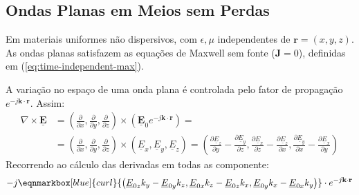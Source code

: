 \clearpage
\subsection{Ondas Planas em Meios sem Perdas} \label{sec:ondas-sem-perdas}

Em materiais uniformes não dispersivos, com $\epsilon, \mu$ independentes de $\mathbf{r} = (x, y, z)$. As ondas planas satisfazem as equações de Maxwell sem fonte ($\mathbf{J} = 0$), definidas em (\ref{eq:time-independent-max}).

A variação no espaço de uma onda plana é controlada pelo fator de propagação $e^{-j \mathbf{k}\cdot\mathbf{r}}$. Assim:
\begin{equation}
    \begin{aligned}
        \nabla \times \mathbf{\underline{E}} &= \left( \frac{\partial}{\partial x}, \frac{\partial}{\partial y}, \frac{\partial}{\partial z} \right)  \times
         \left(\mathbf{\underline{E}}_0 e^{-j\mathbf{k}\cdot \mathbf{r}}\right) = \\[2pt]
         &=
         \left( \frac{\partial}{\partial x}, \frac{\partial}{\partial y}, \frac{\partial}{\partial z} \right)
         \times
         \left(\underline{E}_x,\underline{E}_y,\underline{E}_z\right) =
         \left(
             \frac{\partial \underline{E}_z}{\partial y} - \frac{\partial \underline{E}_y}{\partial z}, 
             \frac{\partial \underline{E}_x}{\partial z} - \frac{\partial \underline{E}_z}{\partial x},
             \frac{\partial \underline{E}_y}{\partial x} - \frac{\partial \underline{E}_x}{\partial y}
         \right)
    \end{aligned}
\end{equation}
Recorrendo ao cálculo das derivadas em todas as componente:
\begin{equation}
    -j\eqnmarkbox[blue]{curl}{\left(
     \underline{E}_{0z} k_y - \underline{E}_{0y} k_z,
     \underline{E}_{0x} k_z - \underline{E}_{0z} k_x,
     \underline{E}_{0y} k_x - \underline{E}_{0x} k_y
    \right)} \cdot e^{-j\mathbf{k}\cdot \mathbf{r}}
\end{equation}

